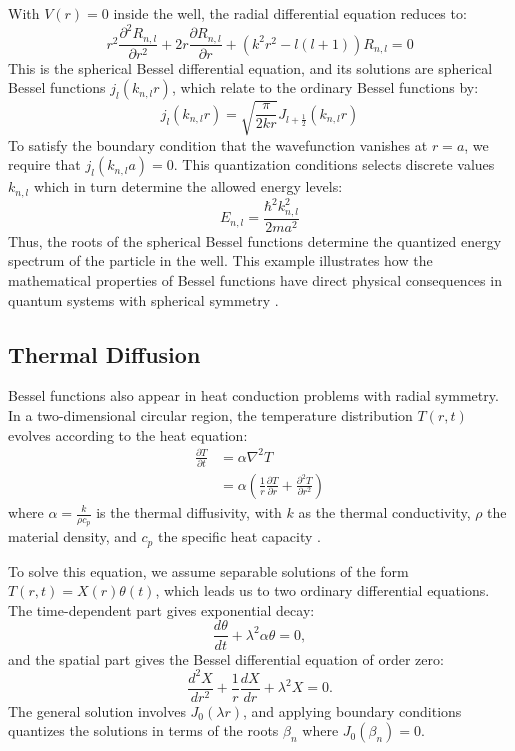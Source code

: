 \documentclass[linenumbers, twocolumn]{aastex631}
\begin{document}
\noindent With $V(r)=0$ inside the well, the radial differential equation
reduces to:
\begin{equation}
    r^2\frac{\partial^2 R_{n,l}}{\partial r^2} + 2r\frac{\partial R_{n,l}}{\partial r} +(k^2r^2-l(l+1))R_{n,l}=0
\end{equation}
\noindent This is the spherical Bessel differential equation, and its solutions
are spherical Bessel functions $j_l(k_{n,l}r)$, which relate to the ordinary
Bessel functions by:
\begin{equation}
    j_l(k_{n,l}r)=\sqrt{\frac{\pi}{2kr}}J_{l+\frac{1}{2}}(k_{n,l}r)
\end{equation}
\noindent To satisfy the boundary condition that the wavefunction vanishes at
$r=a$, we require that $j_l(k_{n,l}a)=0$. This quantization conditions selects
discrete values $k_{n,l}$ which in turn determine the allowed energy levels:
\begin{equation}
    E_{n,l}=\frac{\hbar^2k_{n,l}^2}{2ma^2}
\end{equation}
\noindent Thus, the roots of the spherical Bessel functions determine the
quantized energy spectrum of the particle in the well. This example illustrates how
the mathematical properties of Bessel functions have direct physical 
consequences in quantum systems with spherical symmetry \cite{weisstein}.\\


\subsection{Thermal Diffusion}

Bessel functions also appear in heat conduction problems with radial symmetry.
In a two-dimensional circular region, the temperature distribution $T(r,t)$
evolves according to the heat equation:
\begin{align}
    \frac{\partial T}{\partial t}&=\alpha\nabla^2T\\
    &=\alpha\left(\frac{1}{r} \frac{\partial T}{\partial r} + \frac{\partial^2 T}{\partial r^2}\right)
\end{align}
\noindent where  $\alpha=\frac{k}{\rho c_p}$ is the thermal diffusivity, with
$k$ as the thermal conductivity, $\rho$ the material density, and $c_p$ the
specific heat capacity \cite{hahn}.

\noindent To solve this equation, we assume separable solutions of the form
$T(r,t)=X(r)\theta(t)$, which leads us to two ordinary differential equations.
The time-dependent part gives exponential decay:
\begin{equation}
    \frac{d\theta}{dt}+\lambda^2\alpha\theta=0,
\end{equation}
\noindent and the spatial part gives the Bessel differential equation
of order zero:
\begin{equation}
    \frac{d^2X}{dr^2}+\frac{1}{r}\frac{dX}{dr}+\lambda^2X=0.
\end{equation}
\noindent The general solution involves $J_0(\lambda r)$, and applying boundary
conditions quantizes the solutions in terms of the roots $\beta_n$ where
$J_0(\beta_n)=0$.
\end{document}
